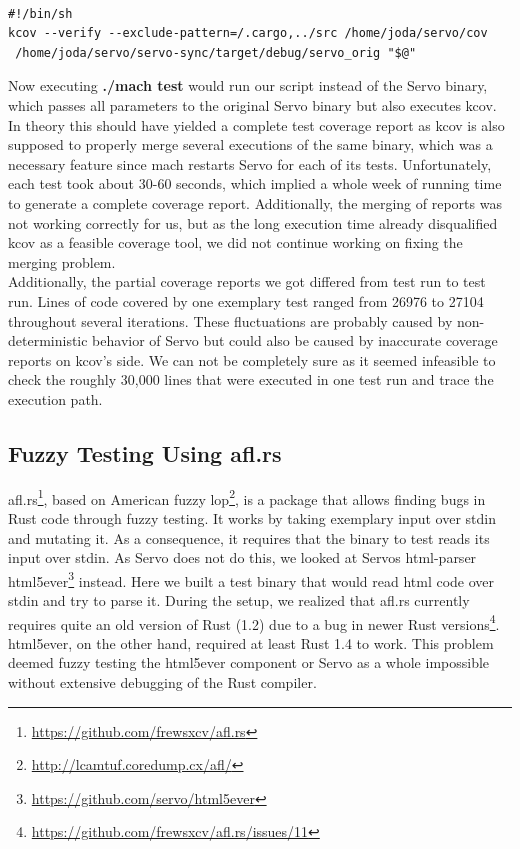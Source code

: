 \documentclass{scrartcl}
\begin{document}
\begin{verbatim}

#!/bin/sh
kcov --verify --exclude-pattern=/.cargo,../src /home/joda/servo/cov 
 /home/joda/servo/servo-sync/target/debug/servo_orig "$@"

\end{verbatim}

Now executing \textbf{./mach test} would run our script instead of the Servo binary, which passes all parameters to the original Servo binary but also executes kcov. In theory this should have yielded a complete test coverage report as kcov is also supposed to properly merge several executions of the same binary, which was a necessary feature since mach restarts Servo for each of its tests. Unfortunately, each test took about 30-60 seconds, which implied a whole week of running time to generate a complete coverage report. Additionally, the merging of reports was not working correctly for us, but as the long execution time already disqualified kcov as a feasible coverage tool, we did not continue working on fixing the merging problem.\\

Additionally, the partial coverage reports we got differed from test run to test run. Lines of code covered by one exemplary test ranged from 26976 to 27104 throughout several iterations. These fluctuations are probably caused by non-deterministic behavior of Servo but could also be caused by inaccurate coverage reports on kcov's side. We can not be completely sure as it seemed infeasible to check the roughly 30,000 lines that were executed in one test run and trace the execution path.


\subsection{Fuzzy Testing Using afl.rs}

afl.rs\footnote{\url{https://github.com/frewsxcv/afl.rs}}, based on American fuzzy lop\footnote{\url{http://lcamtuf.coredump.cx/afl/}}, is a package that allows finding bugs in Rust code through fuzzy testing. It works by taking exemplary input over stdin and mutating it. As a consequence, it requires that the binary to test reads its input over stdin. As Servo does not do this, we looked at Servos html-parser html5ever\footnote{\url{https://github.com/servo/html5ever}} instead. Here we built a test binary that would read html code over stdin and try to parse it. During the setup, we realized that afl.rs currently requires quite an old version of Rust (1.2) due to a bug in newer Rust versions\footnote{\url{https://github.com/frewsxcv/afl.rs/issues/11}}. html5ever, on the other hand, required at least Rust 1.4 to work. This problem deemed fuzzy testing the html5ever component or Servo as a whole impossible without extensive debugging of the Rust compiler.
\end{document}
